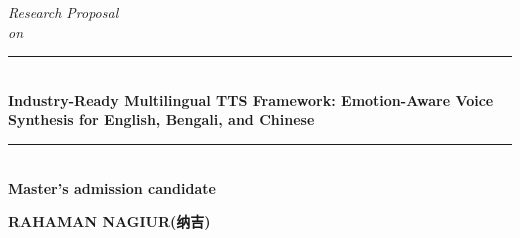 \documentclass[12pt]{article}
\newcommand{\HRule}{\rule{\linewidth}{1mm}}
\begin{document}
\begin{titlepage}
\begin{center}
    \vspace*{2cm}

    \textit{ Research Proposal \\on}

    \HRule \\[0.3cm]
    { \large \bfseries Industry-Ready Multilingual TTS Framework: Emotion-Aware Voice Synthesis for English, Bengali, and Chinese}\\[0.1cm] 
    \HRule \\[0.3cm]


    \large{ \bfseries Master's admission candidate}
    \vspace*{7cm}
    

    \begin{CJK*}{UTF8}{gbsn}
        \large{ \bfseries RAHAMAN NAGIUR(纳吉)}
    \end{CJK*}

    
\end{center}
\end{titlepage}


\newpage









   




\printbibliography
\end{document}
